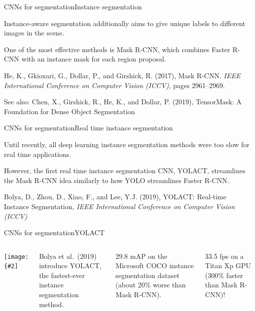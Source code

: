 \documentclass[aspectratio=169]{beamer}
\newcommand{\myfig}[3]{\centerline{\texttt{[image: \{\#2]}}}
\begin{document}
\begin{frame}{CNNs for segmentation}{Instance segmentation}

  \alert{Instance-aware} segmentation additionally aims to give unique
  labels to different images in the scene.

  \medskip

  One of the most effective methods is \alert{Mask R-CNN}, which
  combines Faster R-CNN with an instance mask for each region
  proposal.

  \medskip
  
  He, K., Gkioxari, G., Dollar, P., and Girshick, R. (2017), Mask
  R-CNN.  \textit{IEEE International Conference on Computer Vision
    (ICCV)}, pages 2961--2969.

  \medskip

  See also: Chen, X., Girshick, R., He, K., and Dollar, P. (2019),
  TensorMask: A Foundation for Dense Object Segmentation

\end{frame}


\begin{frame}{CNNs for segmentation}{Real time instance segmentation}

  Until recently, all deep learning instance segmentation methods were
  too slow for \alert{real time} applications.

  \medskip

  However, the first real time instance segmentation CNN,
  \alert{YOLACT}, streamlines the Mask R-CNN idea similarly to how
  YOLO streamlines Faster R-CNN.

  \medskip
  
  Bolya, D., Zhou, D., Xiao, F., and Lee, Y.J. (2019), YOLACT:
  Real-time Instance Segmentation, \textit{IEEE International
    Conference on Computer Vision (ICCV)}

\end{frame}


\begin{frame}{CNNs for segmentation}{YOLACT}

  \begin{columns}

    \column{3.2in}
    
    \myfig{3in}{bolya-fig1}{Bolya, Zhou, Xiao, and Lee (2019), Fig.\ 1}

    \column{1.8in}

    Bolya et al.\ (2019) introduce YOLACT, the fastest-ever instance
    segmentation method.

    \medskip

    29.8 mAP on the Microsoft COCO instance segmentation dataset (about
    20\% worse than Mask R-CNN).

    \medskip

    33.5 fps on a Titan Xp GPU (300\% faster than Mask R-CNN)!

  \end{columns}
  
\end{frame}
\end{document}
